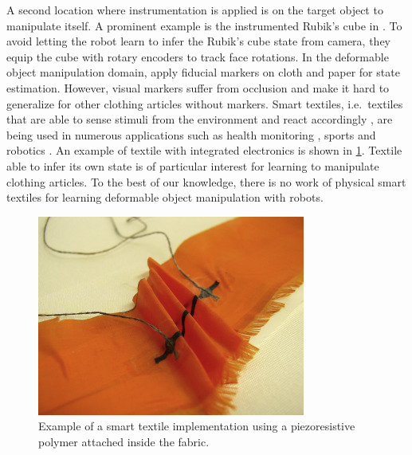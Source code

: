 \documentclass[\home/main.tex]{subfiles}
\begin{document}
A second location where instrumentation is applied is on the target object to manipulate itself. A prominent example is the instrumented Rubik's cube in \autocite{openai2019solving}. To avoid letting the robot learn to infer the Rubik's cube state from camera, they equip the cube with rotary encoders to track face rotations. In the deformable object manipulation domain, \Textcite{Bersch2011, Elbrechter2012} apply fiducial markers on cloth and paper for state estimation. However, visual markers suffer from occlusion and make it hard to generalize for other clothing articles without markers. Smart textiles, i.e.\ textiles that are able to sense stimuli from the environment and react accordingly \autocite{schnee17}, are being used in numerous applications such as health monitoring \autocite{Cochrane2019}, sports \autocite{Presti2019} and robotics \autocite{Yuen2017}. An example of textile with integrated electronics is shown in \cref{fig:smart_textile_example}. Textile able to infer its own state is of particular interest for learning to manipulate clothing articles. To the best of our knowledge, there is no work of physical smart textiles for learning deformable object manipulation with robots. 

\begin{figure}[htbp]
	\centering
	\includegraphics[width=\textwidth]{figures/smart-textile-polymer}	
	\caption[Example of a smart textile implementation.]{Example of a smart textile implementation using a piezoresistive polymer attached inside the fabric.}
	\label{fig:smart_textile_example}
\end{figure}
\end{document}
